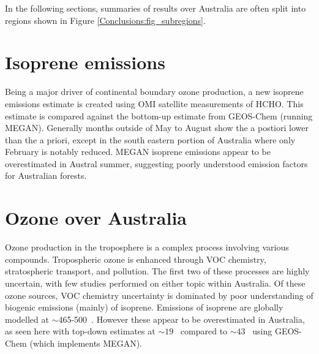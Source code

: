 
  In the following sections, summaries of results over Australia are often split into regions shown in Figure \ref{Conclusions:fig_subregions}.
  

\section{Isoprene emissions}
\label{Conclusions:isoprene}

  Being a major driver of continental boundary ozone production, a new isoprene emissions estimate is created using OMI satellite measurements of HCHO.
  This estimate is compared against the bottom-up estimate from GEOS-Chem (running MEGAN).
  Generally months outside of May to August show the a postiori lower than the a priori, except in the south eastern portion of Australia where only February is notably reduced.
  MEGAN isoprene emissions appear to be overestimated in Austral summer, suggesting poorly understood emission factors for Australian forests.

\section{Ozone over Australia}
\label{Conclusions:ozone}
  
  Ozone production in the troposphere is a complex process involving various compounds.
  Tropospheric ozone is enhanced through VOC chemistry, stratospheric transport, and pollution.
  The first two of these processes are highly uncertain, with few studies performed on either topic within Australia.
  Of these ozone sources, VOC chemistry uncertainty is dominated by poor understanding of biogenic emissions (mainly) of isoprene.
  Emissions of isoprene are globally modelled at $\sim$465-500\tgcpyr  ~\parencite{Guenther2006, Messina2016}. 
  However these appear to be overestimated in Australia, as seen here with top-down estimates at $\sim 19$ \tgcpyr  ~compared to $\sim 43$ \tgcpyr  ~using GEOS-Chem (which implements MEGAN).
  
